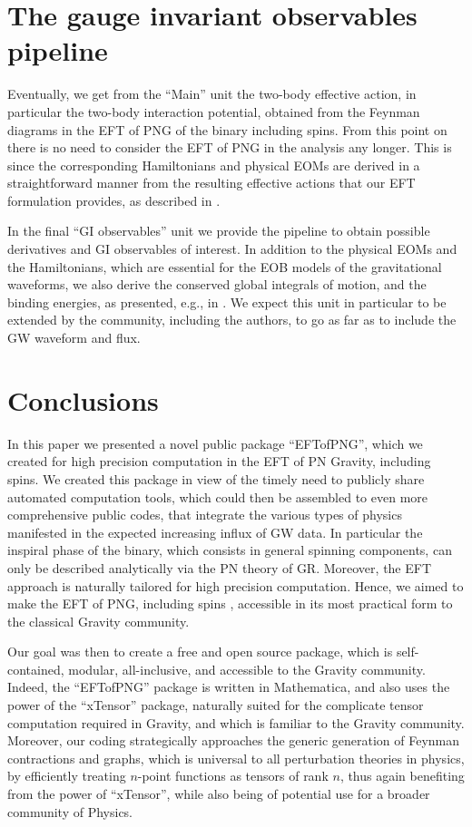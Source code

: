 \documentclass[a4paper,11pt]{article}
\begin{document}
\section{The gauge invariant observables pipeline}
\label{giobs}

Eventually, we get from the ``Main'' unit the two-body effective action, in particular the 
two-body interaction potential, obtained from the Feynman diagrams in the EFT of PNG of the 
binary including spins. From this point on there is no need to consider the EFT of PNG in 
the analysis any longer. This is since the corresponding Hamiltonians and physical EOMs are 
derived in a straightforward manner from the resulting effective actions that our EFT
formulation provides, as described in \cite{Levi:2014sba,Levi:2015msa}. 

In the final ``GI observables'' unit we provide the pipeline to obtain possible 
derivatives and GI observables of interest. In addition to the physical EOMs and the 
Hamiltonians, which are essential for the EOB models of the gravitational waveforms, we also 
derive the conserved global integrals of motion, and the binding energies, as presented, 
e.g., in \cite{Levi:2014sba,Levi:2015uxa,Levi:2016ofk}. We expect this unit in particular to 
be extended by the community, including the authors, to go as far as to include the GW waveform and flux.


\section{Conclusions} 
\label{theendmyfriend}

In this paper we presented a novel public package ``EFTofPNG'', which we created for high 
precision computation in the EFT of PN Gravity, including spins. We created this package in 
view of the timely need to publicly share automated computation tools, which could then be 
assembled to even more comprehensive public codes, that integrate the various types of 
physics manifested in the expected increasing influx of GW data. In particular the inspiral 
phase of the binary, which consists in general spinning components, can only be described 
analytically via the PN theory of GR. Moreover, the EFT approach is naturally tailored for 
high precision computation. Hence, we aimed to make the EFT of PNG, including spins 
\cite{Goldberger:2004jt,Goldberger:2007hy,Levi:2015msa}, accessible in its most practical 
form to the classical Gravity community. 

Our goal was then to create a free and open source package, which is self-contained, 
modular, all-inclusive, and accessible to the Gravity community. Indeed, the ``EFTofPNG'' 
package is written in Mathematica, and also uses the power of the ``xTensor'' package, 
naturally suited for the complicate tensor computation required in Gravity, and which is 
familiar to the Gravity community. Moreover, our coding strategically approaches the generic 
generation of Feynman contractions and graphs, which is universal to all perturbation 
theories in physics, by efficiently treating $n$-point functions as tensors of rank $n$, 
thus again benefiting from the power of ``xTensor'', while also being of potential use for a 
broader community of Physics.
\end{document}
